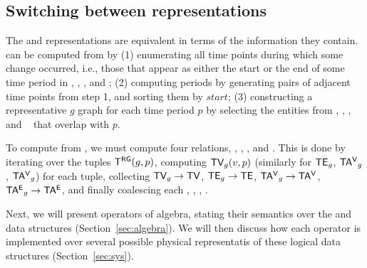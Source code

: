 

\subsection{Switching between representations}  
\label{sec:model:switch}

The \trg and \tve representations are equivalent in terms of the
information they contain.  \trg can be computed from \tve by (1)
enumerating all time points during which some change occurred, i.e.,
those that appear as either the start or the end of some time period
in \tv, \te, \tav, and \tae; (2) computing \rgs periods by generating
pairs of adjacent time points from step 1, and sorting them by
$start$; (3) constructing a representative $g$ graph for each time
period $p$ by selecting the entities from \tv, \te, \tav, and \tae~
that overlap with $p$.

To compute \ve from \rgs, we must compute four relations, \tv, \te,
\tav, and \tae.  This is done by iterating over the tuples $\mathsf{T^{RG}}
(g,p)$, computing $\textsf{TV}_g(v,p)$ (similarly for $\textsf{TE}_g$, $\mathsf{TA^{V}}_g$,
$\mathsf{TA^{V}}_g$) for each tuple, collecting $\textsf{TV}_g \rightarrow \textsf{TV}$, $\textsf{TE}_g
\rightarrow \textsf{TE}$, $\mathsf{TA^{V}}_g \rightarrow \mathsf{TA^{V}}$, $\mathsf{TA^{E}}_g \rightarrow
\mathsf{TA^{E}}$, and finally coalescing each \tv, \te, \tav, \tae.

Next, we will present operators of \tg algebra, stating their
semantics over the \rgs and \ve data structures
(Section~\ref{sec:algebra}).  We will then discuss how each operator
is implemented over several possible physical representatis of these
logical data structures (Section~\ref{sec:sys}).

